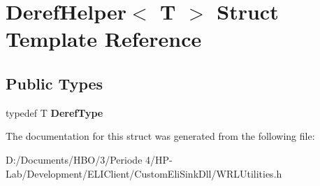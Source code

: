 \hypertarget{struct_deref_helper}{}\section{Deref\+Helper$<$ T $>$ Struct Template Reference}
\label{struct_deref_helper}
\subsection*{Public Types}
\begin{DoxyCompactItemize}
\item 
\mbox{\label{struct_deref_helper_a0deceabfd98e8ab2aaae82c4e6fba9e5}} 
typedef T {\bfseries Deref\+Type}
\end{DoxyCompactItemize}


The documentation for this struct was generated from the following file\+:\begin{DoxyCompactItemize}
\item 
D\+:/\+Documents/\+H\+B\+O/3/\+Periode 4/\+H\+P-\/\+Lab/\+Development/\+E\+L\+I\+Client/\+Custom\+Eli\+Sink\+Dll/W\+R\+L\+Utilities.\+h\end{DoxyCompactItemize}
